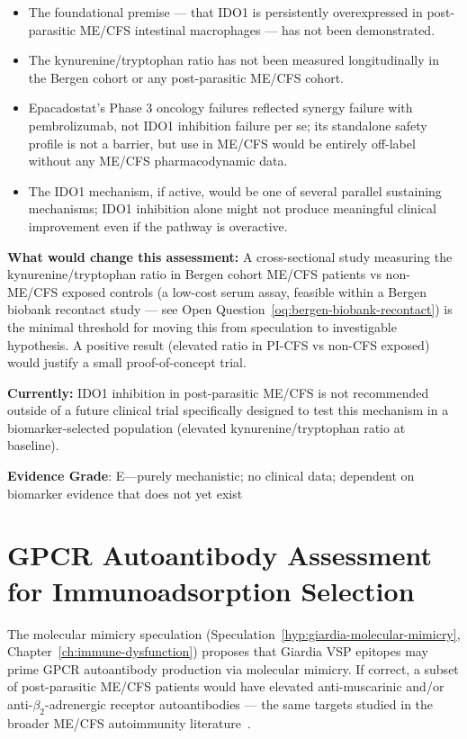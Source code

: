 \begin{itemize}
  \item The foundational premise --- that IDO1 is persistently overexpressed in post-parasitic ME/CFS intestinal macrophages --- has not been demonstrated.
  \item The kynurenine/tryptophan ratio has not been measured longitudinally in the Bergen cohort or any post-parasitic ME/CFS cohort.
  \item Epacadostat's Phase 3 oncology failures reflected synergy failure with pembrolizumab, not IDO1 inhibition failure per se; its standalone safety profile is not a barrier, but use in ME/CFS would be entirely off-label without any ME/CFS pharmacodynamic data.
  \item The IDO1 mechanism, if active, would be one of several parallel sustaining mechanisms; IDO1 inhibition alone might not produce meaningful clinical improvement even if the pathway is overactive.
\end{itemize}

\textbf{What would change this assessment:} A cross-sectional study measuring the kynurenine/tryptophan ratio in Bergen cohort ME/CFS patients vs non-ME/CFS exposed controls (a low-cost serum assay, feasible within a Bergen biobank recontact study --- see Open Question~\ref{oq:bergen-biobank-recontact}) is the minimal threshold for moving this from speculation to investigable hypothesis. A positive result (elevated ratio in PI-CFS vs non-CFS exposed) would justify a small proof-of-concept trial.

\textbf{Currently:} IDO1 inhibition in post-parasitic ME/CFS is not recommended outside of a future clinical trial specifically designed to test this mechanism in a biomarker-selected population (elevated kynurenine/tryptophan ratio at baseline).

\textbf{Evidence Grade}: E---purely mechanistic; no clinical data; dependent on biomarker evidence that does not yet exist

\section{GPCR Autoantibody Assessment for Immunoadsorption Selection}
\label{sec:post-parasitic-autoantibody-screen}

The molecular mimicry speculation (Speculation~\ref{hyp:giardia-molecular-mimicry}, Chapter~\ref{ch:immune-dysfunction}) proposes that Giardia VSP epitopes may prime GPCR autoantibody production via molecular mimicry. If correct, a subset of post-parasitic ME/CFS patients would have elevated anti-muscarinic and/or anti-$\beta_2$-adrenergic receptor autoantibodies --- the same targets studied in the broader ME/CFS autoimmunity literature~\cite{Loebel2016}.

